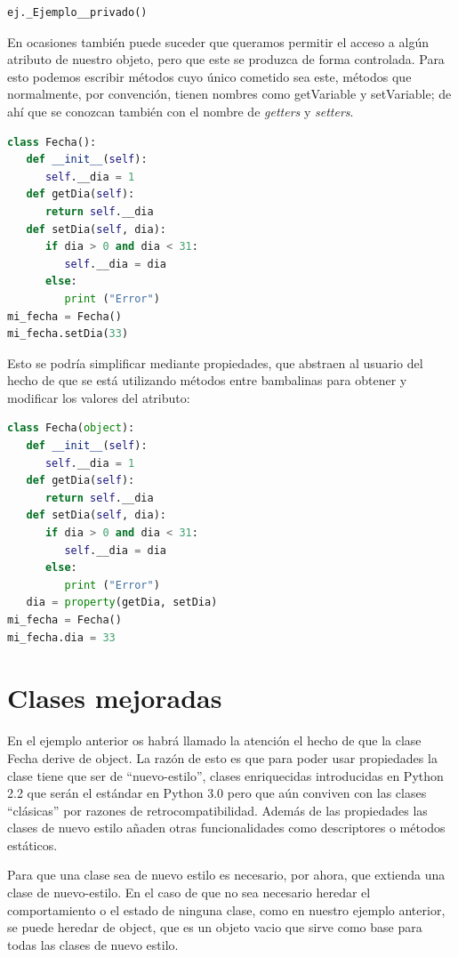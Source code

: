 \documentclass[12pt, twoside]{report}
\begin{document}
\begin{lstlisting}[language=Python]
ej._Ejemplo__privado()
\end{lstlisting}

En ocasiones también puede suceder que queramos permitir el acceso a algún atributo de nuestro objeto, pero que este se produzca de forma controlada. Para esto podemos escribir métodos cuyo único cometido sea este, métodos que normalmente, por convención, tienen nombres como getVariable y setVariable; de ahí que se conozcan también con el nombre de \textit{getters} y \textit{setters}.

\begin{lstlisting}[language=Python]
class Fecha():
   def __init__(self):
      self.__dia = 1
   def getDia(self):
      return self.__dia
   def setDia(self, dia):
      if dia > 0 and dia < 31:
         self.__dia = dia
      else:
         print ("Error")
mi_fecha = Fecha()
mi_fecha.setDia(33)
\end{lstlisting}


Esto se podría simplificar mediante propiedades, que abstraen al usuario del hecho de que se está utilizando métodos entre bambalinas para obtener y modificar los valores del atributo:


\begin{lstlisting}[language=Python]
class Fecha(object):
   def __init__(self):
      self.__dia = 1
   def getDia(self):
      return self.__dia
   def setDia(self, dia):
      if dia > 0 and dia < 31:
         self.__dia = dia
      else:
         print ("Error")
   dia = property(getDia, setDia)
mi_fecha = Fecha()
mi_fecha.dia = 33
\end{lstlisting}

\section{Clases mejoradas}

En el ejemplo anterior os habrá llamado la atención el hecho de que la clase Fecha derive de object. La razón de esto es que para poder usar propiedades la clase tiene que ser de “nuevo-estilo”, clases enriquecidas introducidas en Python 2.2 que serán el estándar en Python 3.0 pero que aún conviven con las clases “clásicas” por razones de retrocompatibilidad. Además de las propiedades las clases de nuevo estilo añaden otras funcionalidades como descriptores o métodos estáticos.

Para que una clase sea de nuevo estilo es necesario, por ahora, que extienda una clase de nuevo-estilo. En el caso de que no sea necesario heredar el comportamiento o el estado de ninguna clase, como en nuestro ejemplo anterior, se puede heredar de object, que es un objeto vacio que sirve como base para todas las clases de nuevo estilo.
\end{document}
